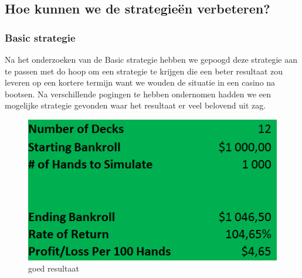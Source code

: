 \documentclass[conference]{IEEEtran}
\begin{document}
\subsection{Hoe kunnen we de strategie\"{e}n verbeteren?}
\subsubsection{Basic strategie}
Na het onderzoeken van de Basic strategie hebben we gepoogd deze strategie aan te passen met do hoop om een strategie te krijgen die een beter resultaat zou leveren op een kortere termijn want we wouden de situatie in een casino na bootsen. Na verschillende pogingen te hebben ondernomen hadden we een mogelijke strategie gevonden waar het resultaat er veel belovend uit zag. 
\begin{figure}[hb]
    \centering
    \includegraphics[scale=0.37]{BasicAAngepastGoedResultaat.png}
    \caption{goed resultaat}
\end{figure}
\end{document}
